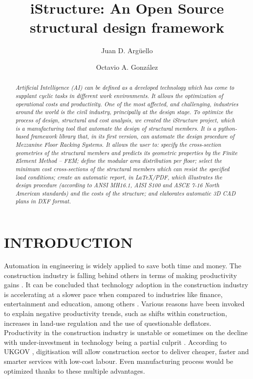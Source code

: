 \documentclass[twocolumn,10pt]{asme2e}
\title{iStructure: An Open Source structural design framework}
\author{Juan D. Arg\"uello
    \affiliation{
    GIEMA\\
    Escuela de Ingenier\'ia Mec\'anica\\
	Universidad Industrial de Santander\\
	Bucaramanga, Colombia\\
	Email: juan2198189@correo.uis.edu.co
    }	
}
\author{Octavio A. Gonz\'alez
    \affiliation{
    GIEMA\\
    Escuela de Ingenier\'ia Mec\'anica\\
	Universidad Industrial de Santander\\
	Bucaramanga, Colombia\\
	Email: agonzalez@uis.edu.co
    }	
}
\begin{document}
\maketitle    

\begin{abstract}
{\it Artificial Intelligence (AI) can be defined as a developed technology which has come to supplant cyclic tasks in different work environments. It allows the optimization of operational costs and productivity.  One of the most affected, and challenging, industries around the world  is  the  civil  industry, principally at the design stage. To optimize the process of design, structural and cost analysis, we created the iStructure project, which is a manufacturing tool that automate the design of structural members. It is a python-based framework library that, in its first version, can automate the design procedure of Mezzanine Floor Racking Systems. It allows the user to: specify the cross-section geometries of the structural members and predicts its geometric properties by the Finite Element Method – FEM; define the modular area distribution per floor; select the minimum cost cross-sections of the structural members which can resist the specified load conditions; create an automatic report, in LaTeX/PDF, which illustrates the design procedure (according to ANSI MH16.1, AISI S100 and ASCE 7-16 North American standards) and the costs of the structure; and elaborates automatic 3D CAD plans in DXF format.  }
\end{abstract}

\section*{INTRODUCTION}

Automation in engineering is widely applied to save both time and money. The construction industry is falling behind others in terms of making productivity gains \cite{CHEN201822}. It can be concluded that technology adoption in the construction industry is accelerating at a slower pace when compared to industries like finance, entertainment and education, among others \cite{AKINOSHO2020101827}.  Various reasons have been invoked to explain negative productivity trends, such as shifts within construction, increases in land-use regulation and the use of questionable deflators\cite{LEE2021103680}. Productivity in the construction industry is unstable or sometimes on the decline with under-investment in technology being a partial culprit \cite{unknown}. According to UKGOV \cite{hm2013construction}, digitisation will allow construction sector to deliver cheaper, faster and smarter services with low-cost labour. Even manufacturing process would be optimized thanks to these multiple advantages.
\end{document}
